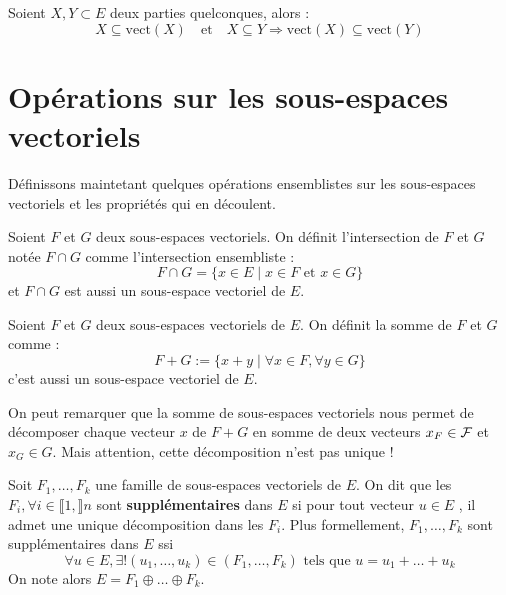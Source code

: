 \begin{prop}
    Soient $X,Y \subset E$ deux parties quelconques, alors : 
        \[ X \subseteq \text{vect}(X) \quad \text{et} \quad X \subseteq Y \Longrightarrow \text{vect}(X) \subseteq \text{vect}(Y) \] 
\end{prop}


\newpage

\section{Opérations sur les sous-espaces vectoriels}

Définissons maintetant quelques opérations ensemblistes sur les sous-espaces vectoriels et les propriétés 
qui en découlent. 

\begin{definition}[Intersection]
    Soient $F$ et $G$ deux sous-espaces vectoriels. On définit l'intersection de $F$ et $G$ notée $ F \cap G$
    comme l'intersection ensembliste : 
        \[ F \cap G = \{x \in E \; | \; x \in F \text{ et } x \in G\} \] 
    et $F \cap G$ est aussi un sous-espace vectoriel de $E$. 
\end{definition}

\begin{definition}[Somme]
    Soient $F$ et $G$ deux sous-espaces vectoriels de $E$. On définit la somme de $F$ et $G$ comme : 
        \[ F + G := \{x + y \; | \; \forall x \in F, \forall y \in G\} \] 
    c'est aussi un sous-espace vectoriel de $E$. 
\end{definition}

\begin{remark}
    On peut remarquer que la somme de sous-espaces vectoriels nous permet de décomposer chaque vecteur $x$ de $F + G$ 
    en somme de deux vecteurs $x_F \in \mathcal{F}$ et $x_G \in G$. 
    Mais attention, cette décomposition n'est pas unique !
\end{remark}

\begin{definition}
    Soit $F_1, \dots, F_k$ une famille de sous-espaces vectoriels de $E$. 
    On dit que les $F_i, \forall i \in \llbracket 1, \rrbracket n$ sont \textbf{supplémentaires} dans $E$ si 
    pour tout vecteur $u \in E$ , il admet une unique décomposition dans les $F_i$. 
    Plus formellement, $F_1, \dots, F_k$ sont supplémentaires dans $E$ ssi 
        \[ \forall u \in E, \exists ! (u_1, \dots, u_k) \in (F_1, \dots, F_k) \text{ tels que } u = u_1 + \dots + u_k \]  
    On note alors $E = F_1 \oplus \dots \oplus F_k $. 
\end{definition}

